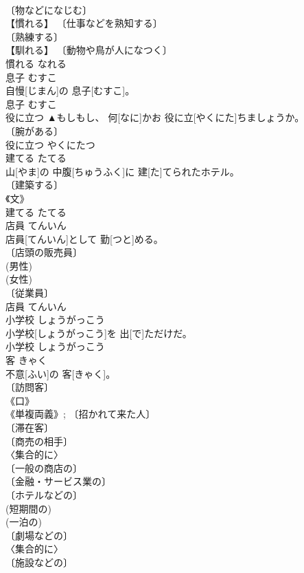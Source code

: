 \documentclass[8pt]{extreport}
\begin{document}
\begin{CJK}{UTF8}{min}
\\	〔物などになじむ〕 
\\	【慣れる】 〔仕事などを熟知する〕 
\\	〔熟練する〕 
\\	【馴れる】 〔動物や鳥が人になつく〕 
\\	慣れる	なれる	
\\	息子	むすこ	
\\	自慢[じまん]の 息子[むすこ]。	
\\	息子	むすこ	
\\	役に立つ		▲もしもし、 何[なに]かお 役に立[やくにた]ちましょうか。	
\\	〔腕がある〕 
\\	役に立つ	やくにたつ	
\\	建てる	たてる	
\\	山[やま]の 中腹[ちゅうふく]に 建[た]てられたホテル。	
\\	〔建築する〕 
\\	《文》 
\\	建てる	たてる	
\\	店員	てんいん	
\\	店員[てんいん]として 勤[つと]める。	
\\	〔店頭の販売員〕 
\\	(男性) 
\\	(女性) 
\\	〔従業員〕 
\\	店員	てんいん	
\\	小学校	しょうがっこう	
\\	小学校[しょうがっこう]を 出[で]ただけだ。	
\\	小学校	しょうがっこう	
\\	客	きゃく	
\\	不意[ふい]の 客[きゃく]。	
\\	〔訪問客〕 
\\	《口》 
\\	《単複両義》; 〔招かれて来た人〕 
\\	〔滞在客〕 
\\	〔商売の相手〕 
\\	〈集合的に〉 
\\	〔一般の商店の〕 
\\	〔金融・サービス業の〕 
\\	〔ホテルなどの〕 
\\	(短期間の) 
\\	(一泊の) 
\\	〔劇場などの〕 
\\	〈集合的に〉 
\\	〔施設などの〕 

\end{CJK}
\end{document}
